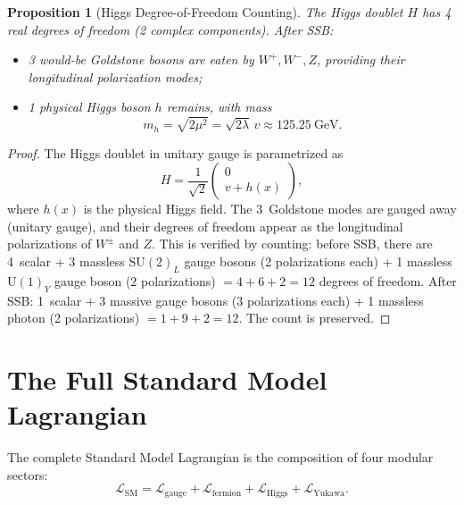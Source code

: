 \documentclass[12pt]{article}
\newtheorem{proposition}[theorem]{Proposition}
\theoremstyle{definition}
\theoremstyle{remark}
\newcommand{\lag}{\mathcal{L}}
\newcommand{\su}[1]{\mathrm{SU}(#1)}
\newcommand{\uu}[1]{\mathrm{U}(#1)}
\begin{document}
\begin{proposition}[Higgs Degree-of-Freedom Counting]
\label{prop:dof-counting}
The Higgs doublet $H$ has 4 real degrees of freedom (2 complex components). After SSB:
\begin{itemize}
\item 3 would-be Goldstone bosons are eaten by $W^+, W^-, Z$, providing their longitudinal polarization modes;
\item 1 physical Higgs boson $h$ remains, with mass
\begin{equation}
m_h = \sqrt{2\mu^2} = \sqrt{2\lambda}\, v \approx 125.25~\text{GeV}.
\end{equation}
\end{itemize}
\end{proposition}

\begin{proof}
The Higgs doublet in unitary gauge is parametrized as
\begin{equation}
H = \frac{1}{\sqrt{2}} \begin{pmatrix} 0 \\ v + h(x) \end{pmatrix},
\end{equation}
where $h(x)$ is the physical Higgs field. The 3~Goldstone modes are gauged away (unitary gauge), and their degrees of freedom appear as the longitudinal polarizations of $W^\pm$ and $Z$. This is verified by counting: before SSB, there are 4~scalar + 3 massless $\su{2}_L$ gauge bosons (2 polarizations each) + 1 massless $\uu{1}_Y$ gauge boson (2 polarizations) $= 4 + 6 + 2 = 12$ degrees of freedom. After SSB: 1~scalar + 3 massive gauge bosons (3 polarizations each) + 1 massless photon (2 polarizations) $= 1 + 9 + 2 = 12$. The count is preserved.
\end{proof}


\section{The Full Standard Model Lagrangian}
\label{sec:full-lagrangian}

The complete Standard Model Lagrangian is the composition of four modular sectors:
\begin{equation}
\label{eq:full-lagrangian}
\lag_{\mathrm{SM}} = \lag_{\mathrm{gauge}} + \lag_{\mathrm{fermion}} + \lag_{\mathrm{Higgs}} + \lag_{\mathrm{Yukawa}}.
\end{equation}
\end{document}
